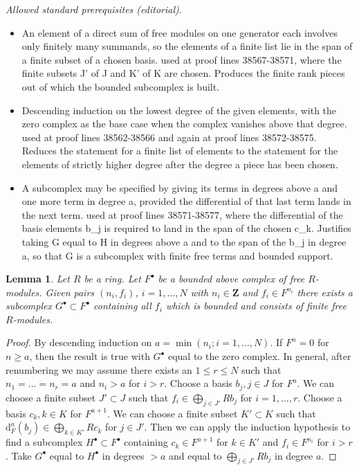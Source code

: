 \documentclass[10pt,a4paper]{amsart}
\theoremstyle{plain}
\newtheorem{lemma}[subsection]{Lemma}
\theoremstyle{definition}
\theoremstyle{remark}
\numberwithin{equation}{subsection}
\begin{document}
\noindent\textit{Allowed standard prerequisites (editorial).}\begin{itemize}
\item An element of a direct sum of free modules on one generator each involves only finitely many summands, so the elements of a finite list lie in the span of a finite subset of a chosen basis. used at proof lines 38567-38571, where the finite subsets J' of J and K' of K are chosen. Produces the finite rank pieces out of which the bounded subcomplex is built.
\item Descending induction on the lowest degree of the given elements, with the zero complex as the base case when the complex vanishes above that degree. used at proof lines 38562-38566 and again at proof lines 38572-38575. Reduces the statement for a finite list of elements to the statement for the elements of strictly higher degree after the degree a piece has been chosen.
\item A subcomplex may be specified by giving its terms in degrees above a and one more term in degree a, provided the differential of that last term lands in the next term. used at proof lines 38571-38577, where the differential of the basis elements b\_j is required to land in the span of the chosen c\_k. Justifies taking G equal to H in degrees above a and to the span of the b\_j in degree a, so that G is a subcomplex with finite free terms and bounded support.
\end{itemize}\medskip
\begin{lemma}
\label{lemma-complex-bounded-above-free-colim-bounded-finite-free}
Let $R$ be a ring. Let $F^\bullet$ be a bounded above complex of
free $R$-modules. Given pairs $(n_i, f_i)$, $i = 1, \ldots, N$
with $n_i \in \mathbf{Z}$ and $f_i \in F^{n_i}$ there exists
a subcomplex $G^\bullet \subset F^\bullet$ containing
all $f_i$ which is bounded and consists of finite free $R$-modules.
\end{lemma}

\begin{proof}
By descending induction on $a = \min(n_i; i = 1, \ldots, N)$.
If $F^n = 0$ for $n \geq a$, then the result is true with
$G^\bullet$ equal to the zero complex. In general, after renumbering
we may assume there exists an $1 \leq r \leq N$ such that
$n_1 = \ldots = n_r = a$ and $n_i > a$ for $i > r$.
Choose a basis $b_j, j \in J$ for $F^a$. We can choose a finite subset
$J' \subset J$ such that $f_i \in \bigoplus_{j \in J'} Rb_j$
for $i = 1, \ldots, r$. Choose a basis $c_k, k \in K$ for $F^{a + 1}$.
We can choose a finite subset $K' \subset K$ such that
$\text{d}_F^a(b_j) \in \bigoplus_{k \in K'} Rc_k$ for
$j \in J'$. Then we can apply the induction
hypothesis to find a subcomplex $H^\bullet \subset F^\bullet$
containing $c_k \in F^{a + 1}$ for $k \in K'$ and
$f_i \in F^{n_i}$ for $i > r$. Take $G^\bullet$ equal to
$H^\bullet$ in degrees $> a$ and equal to $\bigoplus_{j \in J'} Rb_j$
in degree $a$.
\end{proof}
\end{document}
